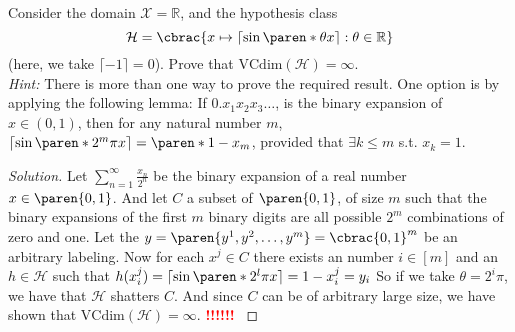 \documentclass[10pt, a4paper, twoside]{amsart}
\theoremstyle{plain}
\newcommand{\R}{\ensuremath{\mathbb{R}}}
\DeclarePairedDelimiter\cbrac\{\}
\DeclarePairedDelimiter\paren()
\newcommand{\cH}{\ensuremath{\mathcal{H}}}
\newcommand{\cX}{\ensuremath{\mathcal{X}}}
\newenvironment{solution}
               {\let\oldqedsymbol=\qedsymbol
                \renewcommand{\qedsymbol}{$\blacktriangleleft$}
                \begin{proof}[Solution]}
               {\end{proof}
                \renewcommand{\qedsymbol}{\oldqedsymbol}}
\newcommand{\TODO}{\textcolor{red}{\textbf{!!!!!! }}}
\begin{document}
Consider the domain $\cX = \R$, and the hypothesis class
\begin{equation*}
  \cH = \cbrac{x \mapsto \left\lceil \sin\paren*{\theta x} \right\rceil : \theta \in \R }
\end{equation*}
(here, we take $\lceil -1 \rceil = 0$). Prove that $\text{VCdim}(\cH) = \infty$.\\
\textit{Hint:} There is more than one way to prove the required result. One option is by applying the following lemma: If $0 . x_1 x_2 x_3 \ldots$, is the binary expansion of $x \in (0,1)$, then for any natural number $m$, $\lceil \sin \paren*{2^m \pi x} \rceil = \paren*{1-x_m}$, provided that $\exists k \leq m$ s.t. $x_k =1$.
\begin{solution}
Let $\sum_{n=1}^{\infty} \frac{x_n}{2^n}$ be the binary expansion of a real number $x \in \paren{0,1}$. And let $C$ a subset of $\paren{0,1}$, of size $m$ such that the binary expansions of the first $m$ binary digits are all possible $2^m$ combinations of zero and one. Let the $y = \paren{y^1,y^2, \ldots, y^m} =  \cbrac{0,1}^m$ be an arbitrary labeling. Now for each $x^j \in C$ there exists an number $i \in [m]$ and an $h \in \cH$ such that $h(x_i^j) = \lceil \sin \paren*{2^l \pi x}\rceil = 1-x_i^j = y_i $ So if we take $\theta = 2^i \pi$, we have that $\cH$ shatters $C$. And since $C$ can be of arbitrary large size, we have shown that $\text{VCdim}(\cH) = \infty$.
\TODO
\end{solution}
\end{document}
